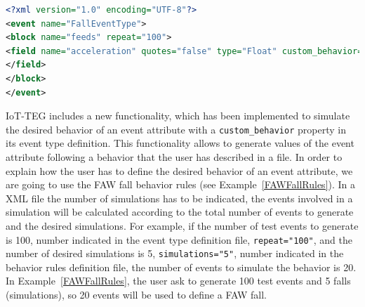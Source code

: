 \documentclass[10pt,journal,compsoc]{IEEEtran}
\begin{document}
\begin{lstlisting}[basicstyle=\ttfamily\footnotesize,language=XML,caption={Fall event type definition, cf.\cite{LorenaFall}.},label=FallEvent, breaklines=true]
<?xml version="1.0" encoding="UTF-8"?>
<event name="FallEventType">
<block name="feeds" repeat="100">
<field name="acceleration" quotes="false" type="Float" custom_behavior="/Path/To/Rule/File">
</field>
</block>
</event>
\end{lstlisting}

IoT-TEG includes a new functionality, which has been implemented to simulate the desired behavior of an event attribute with a \texttt{custom\_behavior} property in its event type definition. This functionality allows to generate values of the event attribute following a behavior that the user has described in a file.
In order to explain how the user has to define the desired behavior of an event attribute, we are going to use the FAW fall behavior rules (see Example~\ref{FAWFallRules}). In a XML file the number of simulations has to be
indicated, the events involved in a simulation will be calculated according to the total number of events to generate and the desired simulations. For example, if the number of test events to generate is 100, number indicated in the event type definition file, \texttt{repeat="100"}, and the number of desired 
simulations is 5, \texttt{simulations="5"}, number indicated in the behavior rules definition file, the number of events to simulate the behavior is 20. In Example~\ref{FAWFallRules}, the user ask to generate 100 test events and 5 falls (simulations), so 20 events will be used to define a FAW fall.
\end{document}
